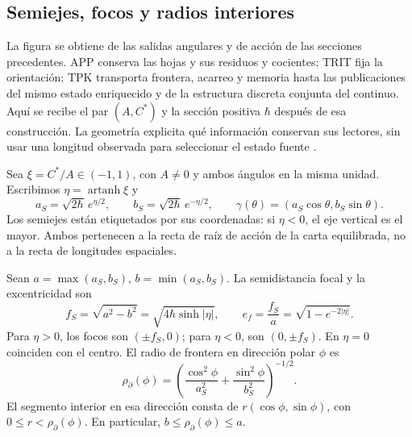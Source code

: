 
\subsection{Semiejes, focos y radios interiores}
\label{sec:ii-elipse-geometria}

La figura se obtiene de las salidas angulares y de acción de las secciones
precedentes. APP conserva las hojas y sus residuos y cocientes; TRIT fija
la orientación; TPK transporta frontera, acarreo y memoria hasta las
publicaciones del mismo estado enriquecido y de la estructura discreta
conjunta del continuo. Aquí se recibe el par \((A,C^*)\) y la sección
positiva \(\hbar\) después de esa construcción. La geometría explicita
qué información conservan sus lectores, sin usar una longitud observada
para seleccionar el estado fuente \cite{elipse,hmtedicionintegral}.

Sea \(\xi=C^*/A\in(-1,1)\), con \(A\ne0\) y ambos ángulos en la
misma unidad. Escribimos \(\eta=\operatorname{artanh}\xi\) y
\[
 a_S=\sqrt{2\hbar}\,e^{\eta/2},\qquad
 b_S=\sqrt{2\hbar}\,e^{-\eta/2},\qquad
 \gamma(\theta)=(a_S\cos\theta,b_S\sin\theta).
\]
Los semiejes están etiquetados por sus coordenadas: si \(\eta<0\),
el eje vertical es el mayor. Ambos pertenecen a la recta de raíz de
acción de la carta equilibrada, no a la recta de longitudes espaciales.

\begin{proposition}
\label{prop:ii-elipse-focos}
Sean \(a=\max(a_S,b_S)\), \(b=\min(a_S,b_S)\). La semidistancia
focal y la excentricidad son
\begin{equation}
 f_S=\sqrt{a^2-b^2}
 =\sqrt{4\hbar\sinh|\eta|},\qquad
 e_f=\frac{f_S}{a}=\sqrt{1-e^{-2|\eta|}}.
 \label{eq:ii-elipse-focal}
\end{equation}
Para \(\eta>0\), los focos son \((\pm f_S,0)\); para
\(\eta<0\), son \((0,\pm f_S)\). En \(\eta=0\) coinciden con
el centro. El radio de frontera en dirección polar \(\phi\) es
\begin{equation}
 \rho_{\partial}(\phi)
 =\left(\frac{\cos^2\phi}{a_S^2}
        +\frac{\sin^2\phi}{b_S^2}\right)^{-1/2}.
 \label{eq:ii-elipse-radio-polar}
\end{equation}
El segmento interior en esa dirección consta de
\(r(\cos\phi,\sin\phi)\), con \(0\le r<\rho_{\partial}(\phi)\).
En particular, \(b\le\rho_{\partial}(\phi)\le a\).
\end{proposition}

